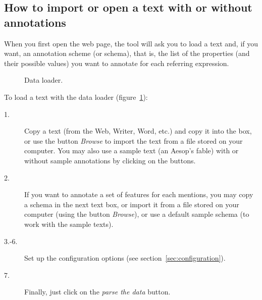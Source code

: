 \documentclass[12pt]{article}
\begin{document}
 \subsection{How to import or open a text with or without annotations}

When you first open the web page, the tool will ask you to load a text and,
if you want, an annotation scheme (or schema), that is, the list of the
properties (and their possible values) you want to annotate for each
referring expression.

\begin{figure}
\begin{center}
\end{center}
\caption{Data loader.}
\label{fig:data-loader}
\end{figure}

To load a text with the data loader (figure~\ref{fig:data-loader}):
\begin{description}
   \item[1.] Copy a text (from the Web, Writer, Word, etc.) and copy it into the
   box, or use the button \emph{Browse} to import the text from a file stored
   on your computer.  You may also use a sample text (an Aesop's fable) with
   or without sample annotations by clicking on the buttons.
   \item[2.] If you want to annotate a set of features for each mentions, you may
   copy a schema in the next text box, or import it from a
   file stored on your computer (using the button \emph{Browse}), or use a
   default sample schema (to work with the sample texts).
   \item[3.-6.] Set up the configuration options (see
   section~\ref{sec:configuration}).
   \item[7.] Finally, just click on the \emph{parse the data} button.
\end{description}
\end{document}
